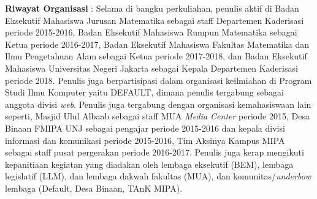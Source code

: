 \noindent \textbf{Riwayat Organisasi} : Selama di bangku perkuliahan, penulis aktif di Badan Eksekutif Mahasiswa Jurusan Matematika sebagai staff Departemen Kaderisasi periode 2015-2016, Badan Eksekutif Mahasiswa Rumpun Matematika sebagai Ketua periode 2016-2017, Badan Eksekutif Mahasiswa Fakultas Matematika dan Ilmu Pengetahuan Alam sebagai Ketua periode 2017-2018, dan Badan Eksekutif Mahasiswa Universitas Negeri Jakarta sebagai Kepala Departemen Kaderisasi periode 2018. Penulis juga berpartisipasi dalam organisasi keilmiahan di Program Studi Ilmu Komputer yaitu DEFAULT, dimana penulis tergabung sebagai anggota divisi \textit{web}. Penulis juga tergabung dengan organisasi kemahasiswaan lain seperti, Masjid Ulul Albaab sebagai staff MUA \textit{Media Center} periode 2015, Desa Binaan FMIPA UNJ sebagai pengajar periode 2015-2016 dan kepala divisi informasi dan komunikasi periode 2015-2016, Tim Aksinya Kampus MIPA sebagai staff pusat pergerakan periode 2016-2017. Penulis juga kerap mengikuti kepanitiaan kegiatan yang diadakan oleh lembaga eksekutif (BEM), lembaga legislatif (LLM), dan lembaga dakwah fakultas (MUA), dan komunitas/\textit{underbow} lembaga (Default, Desa Binaan, TAnK MIPA). 